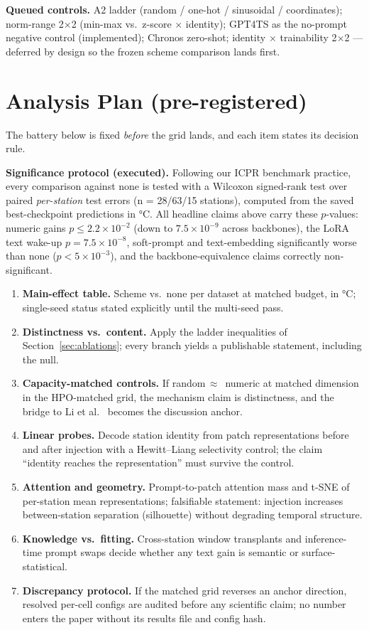\documentclass[sigconf,review]{acmart}
\begin{document}
\textbf{Queued controls.} A2 ladder (random / one-hot / sinusoidal / coordinates);
norm-range 2$\times$2 (min-max vs.\ z-score $\times$ identity); GPT4TS as the
no-prompt negative control (implemented); Chronos zero-shot; identity $\times$
trainability 2$\times$2 --- deferred by design so the frozen scheme comparison
lands first.

\section{Analysis Plan (pre-registered)}
\label{sec:analysis}

The battery below is fixed \emph{before} the grid lands, and each item states its
decision rule.

\textbf{Significance protocol (executed).} Following our ICPR benchmark practice,
every comparison against \textsf{none} is tested with a Wilcoxon signed-rank test
over paired \emph{per-station} test errors (n = 28/63/15 stations), computed from
the saved best-checkpoint predictions in °C. All headline claims above carry these
$p$-values: numeric gains $p\le2.2{\times}10^{-2}$ (down to $7.5{\times}10^{-9}$
across backbones), the LoRA text wake-up $p{=}7.5{\times}10^{-8}$, soft-prompt and
text-embedding significantly worse than \textsf{none} ($p{<}5{\times}10^{-3}$),
and the backbone-equivalence claims correctly non-significant.

\begin{enumerate}
\item \textbf{Main-effect table.} Scheme vs.\ \textsf{none} per dataset at matched
budget, in °C; single-seed status stated explicitly until the multi-seed pass.
\item \textbf{Distinctness vs.\ content.} Apply the ladder inequalities of
Section~\ref{sec:ablations}; every branch yields a publishable statement, including
the null.
\item \textbf{Capacity-matched controls.} If \textsf{random}$\,\approx\,$%
\textsf{numeric} at matched dimension in the HPO-matched grid, the mechanism claim
is distinctness, and the bridge to Li et al.~\cite{li2022random} becomes the
discussion anchor.
\item \textbf{Linear probes.} Decode station identity from patch representations
before and after injection with a Hewitt--Liang selectivity control; the claim
``identity reaches the representation'' must survive the control.
\item \textbf{Attention and geometry.} Prompt-to-patch attention mass and t-SNE of
per-station mean representations; falsifiable statement: injection increases
between-station separation (silhouette) without degrading temporal structure.
\item \textbf{Knowledge vs.\ fitting.} Cross-station window transplants and
inference-time prompt swaps decide whether any text gain is semantic or
surface-statistical.
\item \textbf{Discrepancy protocol.} If the matched grid reverses an anchor
direction, resolved per-cell configs are audited before any scientific claim; no
number enters the paper without its results file and config hash.
\end{enumerate}
\end{document}
